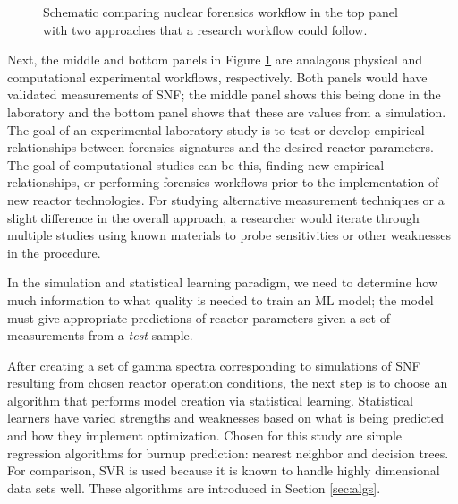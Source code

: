 \begin{figure}[!tbh]
  \caption{Schematic comparing nuclear forensics workflow in the top panel with 
           two approaches that a research workflow could follow.}
  \label{fig:nfworkflows}
\end{figure}

Next, the middle and bottom panels in Figure \ref{fig:nfworkflows} are
analagous physical and computational experimental workflows, respectively.
Both panels would have validated measurements of \gls{SNF}; the middle panel
shows this being done in the laboratory and the bottom panel shows that these
are values from a simulation. The goal of an experimental laboratory study is
to test or develop empirical relationships between forensics signatures and the
desired reactor parameters. The goal of computational studies can be this,
finding new empirical relationships, or performing forensics workflows prior to
the implementation of new reactor technologies.  For studying alternative
measurement techniques or a slight difference in the overall approach, a
researcher would iterate through multiple studies using known materials to
probe sensitivities or other weaknesses in the procedure.

In the simulation and statistical learning paradigm, we need to determine how
much information to what quality is needed to train an \gls{ML} model;
the model must give appropriate predictions of reactor parameters given a set
of measurements from a \textit{test} sample. 

After creating a set of gamma spectra corresponding to simulations of \gls{SNF}
resulting from chosen reactor operation conditions, the next step is to choose
an algorithm that performs model creation via statistical learning.
Statistical learners have varied strengths and weaknesses based on what is
being predicted and how they implement optimization.  Chosen for this study are
simple regression algorithms for burnup prediction: nearest neighbor and
decision trees.  For comparison, \acrfull{SVR} is used because it is known to
handle highly dimensional data sets well.  These algorithms are introduced in
Section \ref{sec:algs}.

